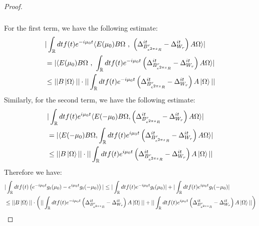 \documentclass[a4paper,11pt]{article}
\theoremstyle{definition}
\newcommand{\lb}{\left(}
\newcommand{\rb}{\right)}
\begin{document}
\begin{proof}
\begin{align}
\begin{split}
        \end{split}
    \end{align}
    For the first term, we have the following estimate:
    \begin{align}
        \begin{split}
            &|\int_\mathbb{R} dt f(t)e^{-i\mu_0 t}\langle E(\mu_0) B\Omega\text{ , }\lb\Delta^{it}_{B^r_{e^{2\pi s}R}} - \Delta^{it}_{W_r}\rb A\Omega\rangle|
            \\&
            =|\langle E(\mu_0)B\Omega\text{ , }\int_\mathbb{R}dt f(t)e^{-i\mu_0 t}\lb\Delta^{it}_{B^r_{e^{2\pi s}R}} - \Delta^{it}_{W_r}\rb A\Omega\rangle|
            \\&
            \leq ||B\ket{\Omega}||\cdot||\int_\mathbb{R} dt f(t) e^{-i\mu_0 t}\lb\Delta^{it}_{B^r_{e^{2\pi s}R}} - \Delta^{it}_{W_r}\rb A\ket{\Omega}||
        \end{split}
    \end{align}
    Similarly, for the second term, we have the following estimate:
    \begin{align}
        \begin{split}
            &|\int_\mathbb{R} dt f(t) e^{i\mu_0 t}\langle E(-\mu_0)B\Omega, \lb \Delta^{it}_{B^r_{e^{2\pi s}R}} - \Delta^{it}_{W_r} \rb A \Omega\rangle|
            \\&
            = |\langle E(-\mu_0)B\Omega, \int_\mathbb{R} dt f(t) e^{i\mu_0 t}\lb\Delta^{it}_{B^r_{e^{2\pi s}R}} - \Delta^{it}_{W_r}\rb A \Omega \rangle|
            \\&
            \leq ||B\ket{\Omega}||\cdot||\int_\mathbb{R} dt f(t) e^{i\mu_0 t}\lb \Delta^{it}_{B^r_{e^{2\pi s}R}} - \Delta^{it}_{W_r} \rb A\ket{\Omega}||
        \end{split}
    \end{align}
    Therefore we have:
    \begin{align}
        \begin{split}
            &|\int_\mathbb{R} dt f(t)\lb e^{-i\mu_0 t}g_t(\mu_0) - e^{i\mu_0 t}g_t(-\mu_0) \rb| \leq |\int_\mathbb{R} dt f(t) e^{-i\mu_0 t}g_t(\mu_0)| + |\int_\mathbb{R} dt f(t) e^{i\mu_0 t}g_t(-\mu_0)|
            \\&
            \leq ||B\ket{\Omega}||\cdot \lb||\int_\mathbb{R} dt f(t) e^{-i\mu_0 t}\lb\Delta^{it}_{B^r_{e^{2\pi s}R}} - \Delta^{it}_{W_r}\rb A\ket{\Omega}|| + ||\int_\mathbb{R} dt f(t) e^{i\mu_0 t}\lb\Delta^{it}_{B^r_{e^{2\pi s}R}} - \Delta^{it}_{W_r}\rb A\ket{\Omega}||\rb
        \end{split}
    \end{align}

\end{proof}
\end{document}
